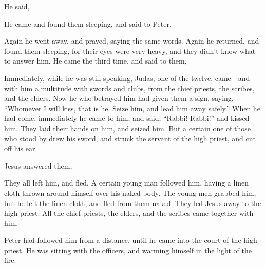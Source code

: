 {He said,
{}
{}
\par }{\PP {}He came and found them sleeping, and said to Peter,
{}
\par }{\PP {}Again he went away, and prayed, saying the same words.
Again he returned, and found them sleeping, for their eyes were very heavy, and they didn’t know what to answer him.
He came the third time, and said to them,
{}
\par }{\PP {}Immediately, while he was still speaking, Judas, one of the twelve, came—and with him a multitude with swords and clubs, from the chief priests, the scribes, and the elders.
Now he who betrayed him had given them a sign, saying, “Whomever I will kiss, that is he. Seize him, and lead him away safely.”
When he had come, immediately he came to him, and said, “Rabbi! Rabbi!” and kissed him.
They laid their hands on him, and seized him.
But a certain one of those who stood by drew his sword, and struck the servant of the high priest, and cut off his ear.
\par }{\PP {}Jesus answered them,
{}
\par }{\PP {}They all left him, and fled.
A certain young man followed him, having a linen cloth thrown around himself over his naked body. The young men grabbed him,
but he left the linen cloth, and fled from them naked.
They led Jesus away to the high priest. All the chief priests, the elders, and the scribes came together with him.
\par }{\PP {}Peter had followed him from a distance, until he came into the court of the high priest. He was sitting with the officers, and warming himself in the light of the fire.
}
